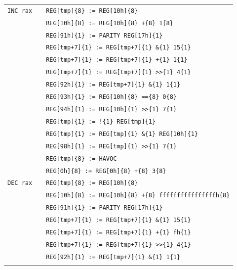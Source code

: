\documentclass[10pt,twocolumn]{article}
\begin{document}
\begin{table}[!h]
\begin{center}
\begin{tabular}{r|rl}
\texttt{INC rax} & %
& \texttt{REG[tmp]\{8\} := REG[10h]\{8\}} \\ & %
& \texttt{REG[10h]\{8\} := REG[10h]\{8\} +\{8\} 1\{8\}} \\ & %

& \texttt{REG[91h]\{1\} := PARITY REG[17h]\{1\}} \\ & %

& \texttt{REG[tmp+7]\{1\} := REG[tmp+7]\{1\} \&\{1\} 15\{1\}} \\ & %
& \texttt{REG[tmp+7]\{1\} := REG[tmp+7]\{1\} +\{1\} 1\{1\}} \\ & %
& \texttt{REG[tmp+7]\{1\} := REG[tmp+7]\{1\} >>\{1\} 4\{1\}} \\ & %
& \texttt{REG[92h]\{1\} := REG[tmp+7]\{1\} \&\{1\} 1\{1\}} \\ & %

& \texttt{REG[93h]\{1\} := REG[10h]\{8\} ==\{8\} 0\{8\}} \\ & %
& \texttt{REG[94h]\{1\} := REG[10h]\{1\} >>\{1\} 7\{1\}} \\ & %

& \texttt{REG[tmp]\{1\} := !\{1\} REG[tmp]\{1\}} \\ & %
& \texttt{REG[tmp]\{1\} := REG[tmp]\{1\} \&\{1\} REG[10h]\{1\}} \\ & %
& \texttt{REG[98h]\{1\} := REG[tmp]\{1\} >>\{1\} 7\{1\}} \\ & %

& \texttt{REG[tmp]\{8\} := HAVOC} \\ &
& \texttt{REG[0h]\{8\} := REG[0h]\{8\} +\{8\} 3\{8\}} \\ \hline



\texttt{DEC rax} & %
& \texttt{REG[tmp]\{8\} := REG[10h]\{8\}} \\ & %
& \texttt{REG[10h]\{8\} := REG[10h]\{8\} +\{8\} ffffffffffffffffh\{8\}} \\ & %

& \texttt{REG[91h]\{1\} := PARITY REG[17h]\{1\}} \\ & %

& \texttt{REG[tmp+7]\{1\} := REG[tmp+7]\{1\} \&\{1\} 15\{1\}} \\ & %
& \texttt{REG[tmp+7]\{1\} := REG[tmp+7]\{1\} +\{1\} fh\{1\}} \\ & %
& \texttt{REG[tmp+7]\{1\} := REG[tmp+7]\{1\} >>\{1\} 4\{1\}} \\ & %
& \texttt{REG[92h]\{1\} := REG[tmp+7]\{1\} \&\{1\} 1\{1\}} \\ & %


\end{tabular}
\end{center}
\end{table}
\end{document}
